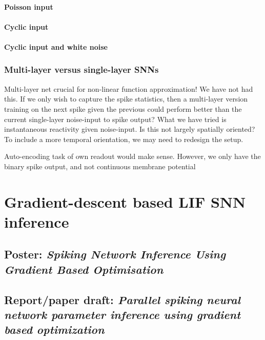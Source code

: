 \documentclass[mphil,deptreport,ai]{infthesis} %
\begin{document}
\subsubsection{Poisson input}

\subsubsection{Cyclic input}

\subsubsection{Cyclic input and white noise}

\subsection{Multi-layer versus single-layer SNNs}

Multi-layer net crucial for non-linear function approximation! We have not had this. If we only wish to capture the spike statistics, then a multi-layer version training on the next spike given the previous could perform better than the current single-layer noise-input to spike output?
What we have tried is instantaneous reactivity given noise-input. Is this not largely spatially oriented? To include a more temporal orientation, we may need to redesign the setup.

Auto-encoding task of own readout would make sense. However, we only have the binary spike output, and not continuous membrane potential



\chapter{Gradient-descent based LIF SNN inference}
\section{Poster: \textit{Spiking Network Inference Using Gradient Based Optimisation}}


\section{Report/paper draft: \textit{Parallel spiking neural network parameter inference using gradient based optimization}}

\end{document}
